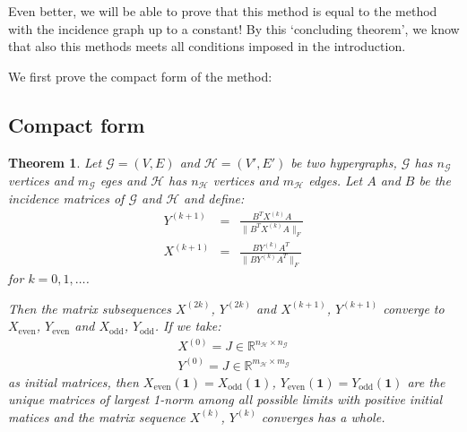 \documentclass[a4paper,11pt]{report}
\newtheorem{theorem}{Theorem}[section]
\newcommand{\R}{{\mathbb R}}
\newcommand{\graf}{\mathscr{G}}
\newcommand{\grafeen}{\mathscr{H}}
\newcommand{\hgraf}{\mathcal{G}}
\newcommand{\hgrafeen}{\mathcal{H}}
\begin{document}
Even better, we will be able to prove that this method is equal to the method with the incidence graph up to a 
constant! By this `concluding theorem', we know that also this methods meets all 
conditions imposed in the introduction. 

We first prove the compact form of the method:

\subsection{Compact form}
 \begin{theorem}\label{incidencegrootbewijs}
   Let $\hgraf=(V,E)$ and $\hgrafeen=(V',E')$ be two hypergraphs, $\hgraf$ has $n_\hgraf$ 
   vertices and $m_\hgraf$ eges and $\hgrafeen$ has $n_\hgrafeen$ vertices and $m_\hgrafeen$ 
   edges. Let $A$ and $B$ be the incidence matrices of $\hgraf$ and $\hgrafeen$ 
   and define:
 \begin{eqnarray}
  Y^{(k+1)} &=& \frac{B^TX^{(k)}A}{\|B^TX^{(k)}A\|_F}\label{edgehypform}\\
   X^{(k+1)} &=& \frac{BY^{(k)}A^T}{\|BY^{(k)}A^T\|_F}\label{nodehypform}
 \end{eqnarray}
  for  $k =  0,1,\ldots$.
  
  Then the matrix subsequences $X^{(2k)}$, $Y^{(2k)}$ and $X^{(k+1)}$, $Y^{(k+1)}$ 
  converge to $X_{\text{even}}$, $Y_{\text{even}}$ and $X_{\text{odd}}$, 
  $Y_{\text{odd}}$. If we take:
  \begin{eqnarray*}  X^{(0)} = J \in \R^{n_\grafeen \times n_\graf}\\
    Y^{(0)} = J \in \R^{m_\grafeen \times m_\graf}
  \end{eqnarray*}
 as initial matrices, then $X_{\text{even}}(\mathbf{1})=X_{\text{odd}}(\mathbf{1})$, $Y_{\text{even}}(\mathbf{1})= Y_{\text{odd}}(\mathbf{1})$ 
 are the unique matrices of largest 1-norm among all possible limits with positive 
 initial matices and the matrix sequence $X^{(k)}$, $Y^{(k)}$ converges has a 
 whole.
  \end{theorem}
\end{document}
